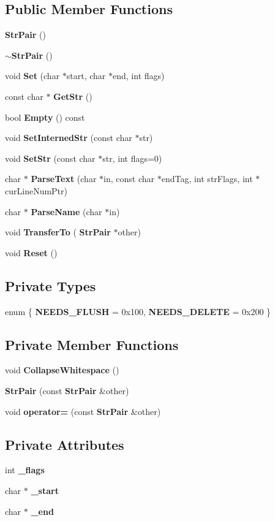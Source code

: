 \subsection*{Public Member Functions}
\begin{DoxyCompactItemize}
\item 
\textbf{ Str\+Pair} ()
\item 
\textbf{ $\sim$\+Str\+Pair} ()
\item 
void \textbf{ Set} (char $\ast$start, char $\ast$end, int flags)
\item 
const char $\ast$ \textbf{ Get\+Str} ()
\item 
bool \textbf{ Empty} () const
\item 
void \textbf{ Set\+Interned\+Str} (const char $\ast$str)
\item 
void \textbf{ Set\+Str} (const char $\ast$str, int flags=0)
\item 
char $\ast$ \textbf{ Parse\+Text} (char $\ast$in, const char $\ast$end\+Tag, int str\+Flags, int $\ast$cur\+Line\+Num\+Ptr)
\item 
char $\ast$ \textbf{ Parse\+Name} (char $\ast$in)
\item 
void \textbf{ Transfer\+To} (\textbf{ Str\+Pair} $\ast$other)
\item 
void \textbf{ Reset} ()
\end{DoxyCompactItemize}
\subsection*{Private Types}
\begin{DoxyCompactItemize}
\item 
enum \{ \textbf{ N\+E\+E\+D\+S\+\_\+\+F\+L\+U\+SH} = 0x100, 
\textbf{ N\+E\+E\+D\+S\+\_\+\+D\+E\+L\+E\+TE} = 0x200
 \}
\end{DoxyCompactItemize}
\subsection*{Private Member Functions}
\begin{DoxyCompactItemize}
\item 
void \textbf{ Collapse\+Whitespace} ()
\item 
\textbf{ Str\+Pair} (const \textbf{ Str\+Pair} \&other)
\item 
void \textbf{ operator=} (const \textbf{ Str\+Pair} \&other)
\end{DoxyCompactItemize}
\subsection*{Private Attributes}
\begin{DoxyCompactItemize}
\item 
int \textbf{ \+\_\+flags}
\item 
char $\ast$ \textbf{ \+\_\+start}
\item 
char $\ast$ \textbf{ \+\_\+end}
\end{DoxyCompactItemize}



